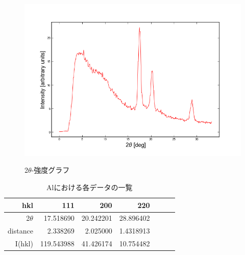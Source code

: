 \documentclass[a4paper,12pt]{jarticle}
\begin{document}
   \begin{figure}[htbp]
    \begin{center}
     \includegraphics[clip,width=12.0cm]{Al_plot.png}
     \label{fig:Al_plot}
     \caption{2$\theta$-強度グラフ}
    \end{center}
   \end{figure}

   \begin{table}[htbp]
    \begin{center}

       \caption{Alにおける各データの一覧}
        \begin{tabular}{|r|r|r|r|r|r|r|}
         \hline
                 hkl   &     111   &     200   &     220   \\
         \hline
			2$\theta$  & 17.518690 & 20.242201 & 28.896402 \\
			distance   &  2.338269 &  2.025000 & 1.4318913 \\
			I(hkl)     & 119.543988 & 41.426174 & 10.754482 \\
         \hline

         \hline
        \end{tabular}
       \label{table:Al}

      \end{center}
     \end{table}
     
\end{document}
